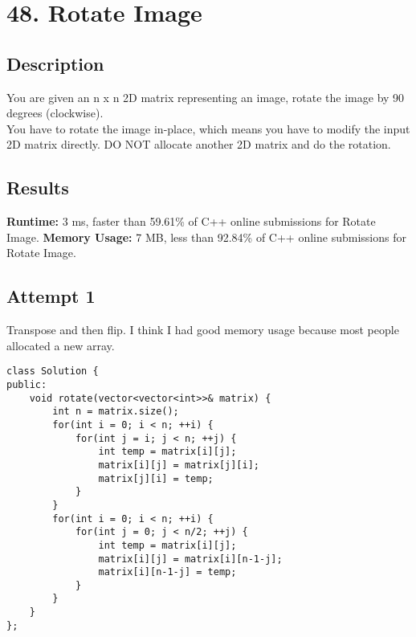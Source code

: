 \chapter{48. Rotate Image}
\section{Description}
You are given an n x n 2D matrix representing an image, rotate the image by 90 degrees (clockwise).
\\
You have to rotate the image in-place, which means you have to modify the input 2D matrix directly. DO NOT allocate another 2D matrix and do the rotation.
\section{Results}
\textbf{Runtime:}
3 ms, faster than 59.61\% of C++ online submissions for Rotate Image.
\textbf{Memory Usage:}
7 MB, less than 92.84\% of C++ online submissions for Rotate Image.
\newpage
\section{Attempt 1}
Transpose and then flip. I think I had good memory usage because most people allocated a new array.
\begin{lstlisting}
class Solution {
public:
    void rotate(vector<vector<int>>& matrix) {
        int n = matrix.size();
        for(int i = 0; i < n; ++i) {
            for(int j = i; j < n; ++j) {
                int temp = matrix[i][j];
                matrix[i][j] = matrix[j][i];
                matrix[j][i] = temp;
            }
        }
        for(int i = 0; i < n; ++i) {
            for(int j = 0; j < n/2; ++j) {
                int temp = matrix[i][j];
                matrix[i][j] = matrix[i][n-1-j];
                matrix[i][n-1-j] = temp;
            }
        }
    }
};
\end{lstlisting}
